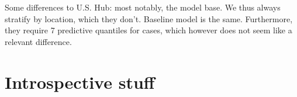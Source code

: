 Some differences to U.S. Hub: most notably, the model base. We thus always stratify by location, which they don't. Baseline model is the same. Furthermore, they require 7 predictive quantiles for cases, which however does not seem like a relevant difference.
\section{Introspective stuff}
